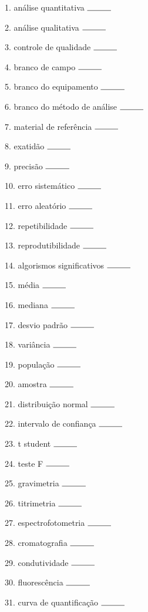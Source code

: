 \documentclass[a4paper,10pt]{article}
\begin{document}
\begin{multicols}{2}

1. análise quantitativa $\rule{1cm}{0.15mm}$

2. análise qualitativa $\rule{1cm}{0.15mm}$

3. controle de qualidade $\rule{1cm}{0.15mm}$

4. branco de campo $\rule{1cm}{0.15mm}$

5. branco do equipamento $\rule{1cm}{0.15mm}$

6. branco do método de análise $\rule{1cm}{0.15mm}$

7. material de referência $\rule{1cm}{0.15mm}$

8. exatidão $\rule{1cm}{0.15mm}$

9. precisão $\rule{1cm}{0.15mm}$

10. erro sistemático $\rule{1cm}{0.15mm}$

11. erro aleatório $\rule{1cm}{0.15mm}$

12. repetibilidade $\rule{1cm}{0.15mm}$

13. reprodutibilidade $\rule{1cm}{0.15mm}$

14. algorismos significativos $\rule{1cm}{0.15mm}$

15. média $\rule{1cm}{0.15mm}$

16. mediana $\rule{1cm}{0.15mm}$

17. desvio padrão $\rule{1cm}{0.15mm}$

18. variância $\rule{1cm}{0.15mm}$

19. população $\rule{1cm}{0.15mm}$

20. amostra $\rule{1cm}{0.15mm}$

21. distribuição normal $\rule{1cm}{0.15mm}$

22. intervalo de confiança $\rule{1cm}{0.15mm}$

23. t student $\rule{1cm}{0.15mm}$

24. teste F $\rule{1cm}{0.15mm}$

25. gravimetria $\rule{1cm}{0.15mm}$

26. titrimetria $\rule{1cm}{0.15mm}$

27. espectrofotometria $\rule{1cm}{0.15mm}$

28. cromatografia $\rule{1cm}{0.15mm}$

29. condutividade $\rule{1cm}{0.15mm}$

30. fluorescência $\rule{1cm}{0.15mm}$

31. curva de quantificação $\rule{1cm}{0.15mm}$


\end{multicols}
\end{document}
